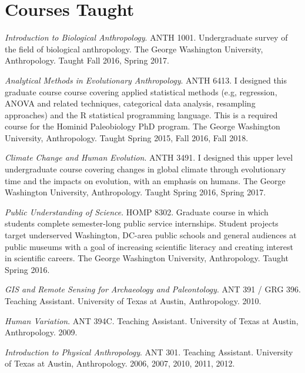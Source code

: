 \documentclass{article}
\newenvironment{mylist}
{\begin{description}[style=unboxed,leftmargin=1.3cm]}
{\end{description}}
\begin{document}
\section*{Courses Taught}
\begin{mylist}

\item[]\emph{Introduction to Biological Anthropology}. ANTH 1001. Undergraduate survey of the field of biological anthropology. The George Washington University, Anthropology. Taught Fall 2016, Spring 2017.

\item[] \emph{Analytical Methods in Evolutionary Anthropology}. ANTH 6413. I designed this graduate course course covering applied statistical methods (e.g, regression, ANOVA and related techniques, categorical data analysis, resampling approaches) and the R statistical programming language. This is a required course for the Hominid Paleobiology PhD program. The George Washington University, Anthropology. Taught Spring 2015, Fall 2016, Fall 2018.

\item[] \emph{Climate Change and Human Evolution}. ANTH 3491. I designed this upper level undergraduate course covering changes in global climate through evolutionary time and the impacts on evolution, with an emphasis on humans. The George Washington University, Anthropology. Taught Spring 2016, Spring 2017.

\item[] \emph{Public Understanding of Science}. HOMP 8302.  Graduate course in which students complete semester-long public service internships. Student projects target underserved Washington, DC-area public schools and general audiences at public museums with a goal of increasing scientific literacy and creating interest in scientific careers. The George Washington University, Anthropology. Taught Spring 2016.

\item[] \emph{GIS and Remote Sensing for Archaeology and Paleontology}. ANT 391 / GRG 396. Teaching Assistant.  University of Texas at Austin, Anthropology. 2010.

\item[] \emph{Human Variation}. ANT 394C. Teaching Assistant. University of Texas at Austin, Anthropology. 2009.

\item[] \emph{Introduction to Physical Anthropology}. ANT 301. Teaching Assistant. University of Texas at Austin, Anthropology. 2006, 2007, 2010, 2011, 2012.
\end{mylist}
\end{document}
